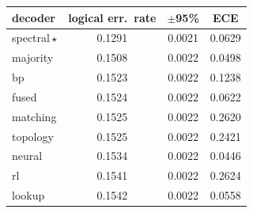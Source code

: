 \begin{tabular}{lccc}
\toprule
decoder & logical err.\ rate & $\pm$95\% & ECE \\
\midrule
spectral\,$\star$ & 0.1291 & 0.0021 & 0.0629 \\
majority & 0.1508 & 0.0022 & 0.0498 \\
bp & 0.1523 & 0.0022 & 0.1238 \\
fused & 0.1524 & 0.0022 & 0.0622 \\
matching & 0.1525 & 0.0022 & 0.2620 \\
topology & 0.1525 & 0.0022 & 0.2421 \\
neural & 0.1534 & 0.0022 & 0.0446 \\
rl & 0.1541 & 0.0022 & 0.2624 \\
lookup & 0.1542 & 0.0022 & 0.0558 \\
\bottomrule
\end{tabular}
